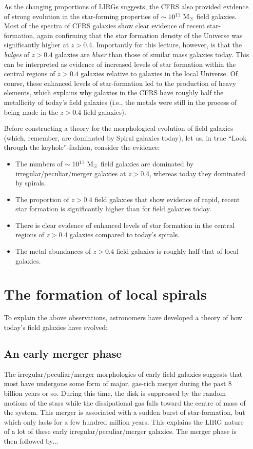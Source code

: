 \documentclass[11pt]{article}
\begin{document}
As the changing proportions of LIRGs suggests, the CFRS also provided
evidence of strong evolution in the star-forming properties of
$\sim10^{11}~{\rm M_{\odot}}$ field galaxies. Most of the spectra of
CFRS galaxies show clear evidence of recent star-formation, again
confirming that the star formation density of the Universe was
significantly higher at $z>0.4$. Importantly for this lecture,
however, is that the {\it bulges} of $z>0.4$ galaxies are {\it bluer}
than those of similar mass galaxies today. This can be interpreted as
evidence of increased levels of star formation within the central
regions of $z>0.4$ galaxies relative to galaxies in the local
Universe. Of course, these enhanced levels of star-formation led to the
production of heavy elements, which explains why galaxies in the CFRS
have roughly half the metallicity of today's field galaxies (i.e., the
metals were still in the process of being made in the $z>0.4$ field
galaxies).

Before constructing a theory for the morphological evolution of field
galaxies (which, remember, are dominated by Spiral galaxies today),
let us, in true ``Look through the keyhole''-fashion, consider the
evidence:
\begin{itemize} 
\item The numbers of $\sim10^{11}~{\rm M_{\odot}}$ field galaxies are
  dominated by irregular/peculiar/merger galaxies at $z>0.4$, whereas
  today they dominated by spirals.
\item The proportion of $z>0.4$ field galaxies that show evidence of
  rapid, recent star formation is significantly higher than for field
  galaxies today.
\item There is clear evidence of enhanced levels of star formation in
  the central regions of $z>0.4$ galaxies compared to today's spirals.
\item The metal abundances of $z>0.4$ field galaxies is roughly half
  that of local galaxies. 
\end{itemize}

\section{The formation of local spirals}
To explain the above observations, astronomers have developed a theory
of how today's field galaxies have evolved:

\subsection{An early merger phase}
The irregular/peculiar/merger morphologies of early field galaxies
suggests that most have undergone some form of major, gas-rich merger
during the past 8 billion years or so. During this time, the disk is
suppressed by the random motions of the stars while the dissipational
gas falls toward the centre of mass of the system. This merger is
associated with a sudden burst of star-formation, but which only lasts
for a few hundred million years. This explains the LIRG nature of a
lot of these early irregular/peculiar/merger galaxies. The merger
phase is then followed by...
\end{document}
